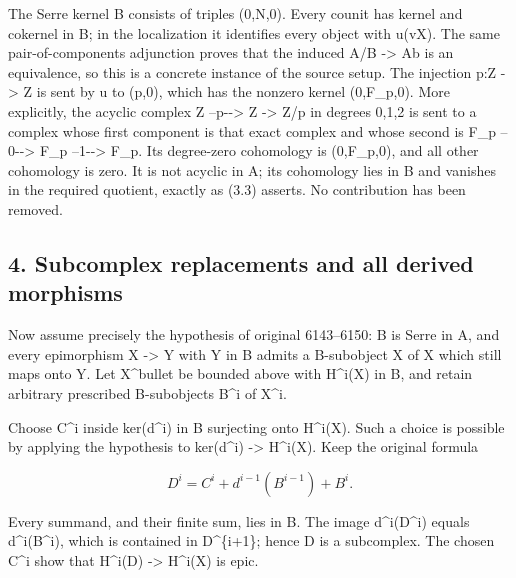 \documentclass[11pt]{article}
\begin{document}
The Serre kernel B consists of triples (0,\allowbreak{}N,\allowbreak{}0)\allowbreak{}. Every counit has kernel and cokernel in B; in the localization it identifies every object with u(vX)\allowbreak{}. The same pair-of-components adjunction proves that the induced A/\allowbreak{}B \allowbreak{}-> Ab is an equivalence,\allowbreak{} so this is a concrete instance of the source setup. The injection p:\allowbreak{}Z \allowbreak{}-> Z is sent by u to (p,\allowbreak{}0)\allowbreak{},\allowbreak{} which has the nonzero kernel (0,\allowbreak{}F\_\allowbreak{}p,\allowbreak{}0)\allowbreak{}. More explicitly,\allowbreak{} the acyclic complex Z --p-\allowbreak{}-> Z \allowbreak{}-> Z/\allowbreak{}p in degrees 0,\allowbreak{}1,\allowbreak{}2 is sent to a complex whose first component is that exact complex and whose second is F\_\allowbreak{}p --0-\allowbreak{}-> F\_\allowbreak{}p --1-\allowbreak{}-> F\_\allowbreak{}p. Its degree-zero cohomology is (0,\allowbreak{}F\_\allowbreak{}p,\allowbreak{}0)\allowbreak{},\allowbreak{} and all other cohomology is zero. It is not acyclic in A; its cohomology lies in B and vanishes in the required quotient,\allowbreak{} exactly as (3.3)\allowbreak{} asserts. No contribution has been removed.

\subsection{4. Subcomplex replacements and all derived morphisms}\label{proofs-5910-6199-subcomplex-replacements-and-all-derived-morphisms}

Now assume precisely the hypothesis of original 6143–\allowbreak{}6150:\allowbreak{} B is Serre in A,\allowbreak{} and every epimorphism X \allowbreak{}-> Y with Y in B admits a B-subobject X\textquotesingle{} of X which still maps onto Y. Let X\^{}bullet be bounded above with H\textasciicircum{}i(X)\allowbreak{} in B,\allowbreak{} and retain arbitrary prescribed B-subobjects B\^{}i of X\^{}i.

Choose C\^{}i inside ker(d\textasciicircum{}i)\allowbreak{} in B surjecting onto H\textasciicircum{}i(X)\allowbreak{}. Such a choice is possible by applying the hypothesis to ker(d\textasciicircum{}i)\allowbreak{} \allowbreak{}-> H\textasciicircum{}i(X)\allowbreak{}. Keep the original formula

\[
 D^i=C^i+d^{i-1}(B^{i-1})+B^i.                           \tag{4.1}
\]

Every summand,\allowbreak{} and their finite sum,\allowbreak{} lies in B. The image d\textasciicircum{}i(D\textasciicircum{}i)\allowbreak{} equals d\textasciicircum{}i(B\textasciicircum{}i)\allowbreak{},\allowbreak{} which is contained in D\textasciicircum{}\{i\allowbreak{}+1\}; hence D is a subcomplex. The chosen C\^{}i show that H\textasciicircum{}i(D)\allowbreak{} \allowbreak{}-> H\textasciicircum{}i(X)\allowbreak{} is epic.
\end{document}
